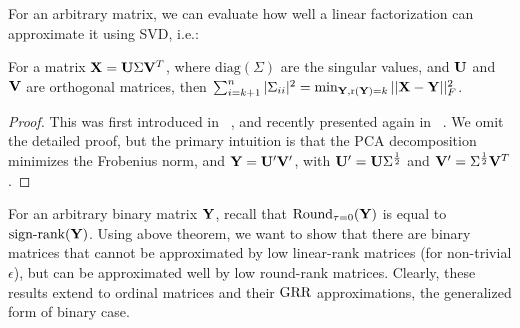 \documentclass{article}
\newcommand{\sameer}[1]{\todo[color=blue!20]{\textbf{s:} #1}{}}
\begin{document}

For an arbitrary matrix, we can evaluate how well a linear factorization can approximate it using SVD, i.e.:
\begin{thm:thm}
\label{thm:pca}
For a matrix $\mathbf{X}=\mathbf{U}\Sigma\mathbf{V}^T$, where $\mathrm{diag}(\Sigma)$ are the singular values, and $\mathbf{U}$ and $\mathbf{V}$ are orthogonal matrices, then $\sum_{i=k+1}^n|\Sigma_{ii}|^2 = \min_{\mathbf{Y},\mathrm{r}(\mathbf{Y})=k}||\mathbf{X}-\mathbf{Y}||^2_F$.
\begin{proof}
This was first introduced in ~\citet{eckart1936approximation}, and recently presented again in ~\citet{udell14:generalized}.
We omit the detailed proof, but the primary intuition is that the PCA decomposition minimizes the Frobenius norm, and $\mathbf{Y}=\mathbf{U}'\mathbf{V}'$, with $\mathbf{U}'=\mathbf{U}\Sigma^{\frac{1}{2}}$ and $\mathbf{V}'=\Sigma^{\frac{1}{2}}\mathbf{V}^T$.
\end{proof}
\end{thm:thm}
For an arbitrary binary matrix $\mathbf{Y}$, recall that $\text{Round}_{\tau=0}(\mathbf{Y})$ is equal to $\text{sign-rank}(\mathbf{Y})$. %
Using above theorem, we want to show that there are binary matrices that cannot be approximated by low linear-rank matrices (for non-trivial $\epsilon$), but can be approximated well by low round-rank matrices. %
Clearly, these results extend to ordinal matrices and their $\text{GRR}$ approximations, the generalized form of binary case. %
\end{document}
